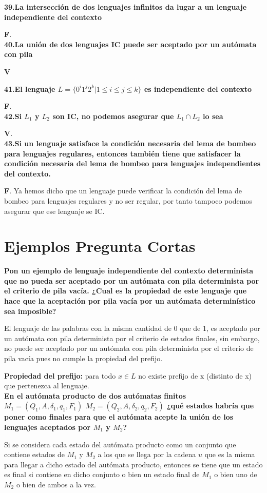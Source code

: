 \documentclass[a4paper,11pt]{article}
\begin{document}
\textbf{39.La intersección de dos lenguajes infinitos da lugar a un lenguaje independiente del contexto}

\textbf{F}. \\

\textbf{40.La unión de dos lenguajes IC puede ser aceptado por un autómata con pila}

\textbf{V}

\textbf{41.El lenguaje $L=\{0^i1^j2^k|1\leq i\leq j\leq k\}$ es independiente del contexto}

\textbf{F}. \\

\textbf{42.Si $L_1$ y $L_2$ son IC, no podemos asegurar que $L_1\cap L_2$ lo sea}

\textbf{V}. \\

\textbf{43.Si un lenguaje satisface la condición necesaria del lema de bombeo para lenguajes regulares, entonces también tiene que satisfacer la condición necesaria del lema de bombeo para lenguajes independientes del contexto.}

\textbf{F}. Ya hemos dicho que un lenguaje puede verificar la condición del lema de bombeo para lenguajes regulares y no ser regular, por tanto tampoco podemos asegurar que ese lenguaje se IC. 

\section{Ejemplos Pregunta Cortas}

\textbf{Pon un ejemplo de lenguaje independiente del contexto determinista que no pueda ser aceptado por un autómata con pila determinista por el criterio de pila vacía. ¿Cual es la propiedad de este lenguaje que hace que la aceptación por pila vacía por un autómata determinístico sea imposible?}

El lenguaje de las palabras con la misma cantidad de 0 que de 1, es aceptado por un autómata con pila determinista por el criterio de estados finales, sin embargo, no puede ser aceptado por un autómata con pila determinista por el criterio de pila vacía pues no cumple la propiedad del prefijo.

\textbf{Propiedad del prefijo:} para todo $x\in L$ no existe prefijo de x (distinto de x) que pertenezca al lenguaje. \\

\textbf{En el autómata producto de dos autómatas finitos $M_1=(Q_1,A,\delta_1,q_1,F_1)$ $M_2 = (Q_2,A,\delta_2,q_2,F_2)$ ¿qué estados habría que poner como finales para que el autómata acepte la unión de los lenguajes aceptados por $M_1$ y $M_2$?}

Si se considera cada estado del autómata producto como un conjunto que contiene estados de $M_1$ y $M_2$ a los que se llega por la cadena $u$ que es la misma para llegar a dicho estado del autómata producto, entonces se tiene que un estado es final si contiene en dicho conjunto o bien un estado final de $M_1$ o bien uno de $M_2$ o bien de ambos a la vez.
\end{document}
